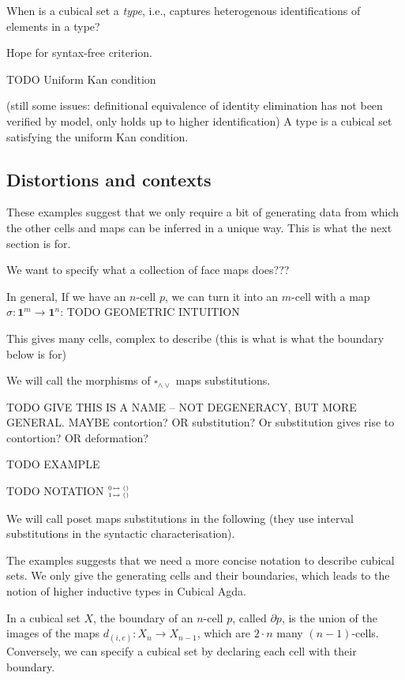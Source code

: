 \documentclass[11pt]{article}
\theoremstyle{definition}
\newcommand{\join}{\wedge}
\newcommand{\meet}{\vee}
\newcommand{\dedekind}{\square_{\join \meet}}
\newcommand{\pint}[1]{\mathbf{1}^{#1}}
\newcommand{\dmap}[2]{d_{({#1} , {#2})}}
\newcommand{\substtwo}[2]{\tiny
  \arraycolsep=.4pt\def\arraystretch{1}
  \begin{array}{ll}
    0 &\mapsto {#1} \\
    1 &\mapsto {#2}
  \end{array}
}
\newcommand{\constzero}{\substtwo{()}{()}}
\begin{document}
When is a cubical set a \emph{type}, i.e., captures heterogenous identifications
of elements in a type?

Hope for syntax-free criterion.

TODO Uniform Kan condition


(still some issues: definitional equivalence of identity elimination has not
been verified by model, only holds up to higher identification)
A type is a cubical set satisfying the uniform Kan condition.

\subsection{Distortions and contexts} %

These examples suggest that we only require a bit of generating data from which
the other cells and maps can be inferred in a unique way. This is what the next
section is for.

We want to specify what a collection of face maps does???

In general, 
If we have an $n$-cell $p$, we can turn it into an $m$-cell with a map $\sigma :
\pint{m} \to \pint{n}$: TODO GEOMETRIC INTUITION

This gives many cells, complex to describe (this is what is what the boundary
below is for)

We will call the morphisms of $\dedekind$ maps substitutions.

TODO GIVE THIS IS A NAME -- NOT DEGENERACY, BUT MORE GENERAL. MAYBE contortion?
OR substitution? Or substitution gives rise to contortion?
OR deformation?

TODO EXAMPLE

TODO NOTATION $\constzero$ 

We will call poset maps substitutions in the following (they use interval
substitutions in the syntactic characterisation).



The examples suggests that we need a more concise notation to describe cubical
sets. We only give the generating cells and their boundaries, which leads to the
notion of higher inductive types in Cubical Agda.

In a cubical set $X$, the boundary of an $n$-cell $p$, called $\partial p$, is
the union of the images of the maps $\dmap{i}{e} : X_n \to X_{n-1}$, which are
$2 \cdot n$ many $(n-1)$-cells. Conversely, we can specify a cubical set by
declaring each cell with their boundary. 
\end{document}
